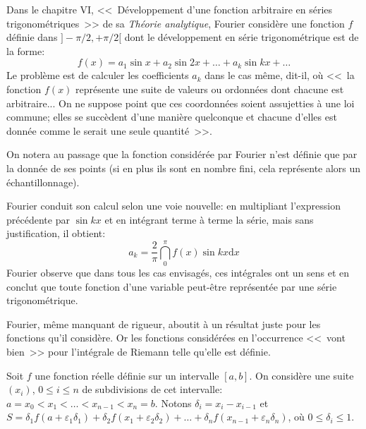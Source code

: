 \medskip
\begin{histoire}%
Dans le chapitre VI, <<~Développement d'une fonction arbitraire en séries
trigonométriques~>> de sa \emph{Théorie analytique}, Fourier
considère une fonction $f$
définie dans $]-\pi/2,+\pi/2[$ dont le développement en série trigonométrique est
de la forme:
\begin{equation} f(x)=a_1\sin x+a_2\sin 2x +\ldots+a_k\sin kx +\ldots\end{equation}
Le problème est de calculer les coefficients $a_k$ dans le cas même, dit-il, où <<~la
fonction $f(x)$ représente une suite de valeurs ou ordonnées dont chacune est
arbitraire... On ne suppose point que ces coordonnées soient assujetties à une
loi commune; elles se succèdent d'une manière quelconque et chacune d'elles
est donnée comme le serait une seule quantité~>>.

On notera au passage que la fonction considérée par Fourier
n'est définie que par la donnée de ses points (si en plus ils sont en nombre fini, cela représente alors
un échantillonnage).

\medskip
Fourier
conduit son calcul selon une voie nouvelle: en multipliant l'expression précédente
par $\sin kx$ et en intégrant terme à terme la série, mais sans justification, il obtient:
\begin{equation}a_k=\frac2{\pi}\dint_0^{\pi} f(x)\sin kx \mathrm dx\end{equation}
Fourier
observe que dans tous les cas envisagés, ces intégrales ont un sens et en conclut
que toute fonction d'une variable peut-être représentée par une série trigonométrique.

Fourier,
même manquant de rigueur, aboutit à un résultat juste pour les fonctions
qu'il considère.
Or les fonctions considérées en l'occurrence <<~vont bien~>> pour l'intégrale de Riemann
telle qu'elle est définie.

\medskip
\begin{definition}
Soit $f$ une fonction réelle définie sur un intervalle $[a,b]$.
On considère une suite $(x_i)$, $0\le i\le n$ de subdivisions de cet intervalle:
$a=x_0 < x_1 <\ldots < x_{n-1} <x_n=b$.
Notons $\delta_i=x_i-x_{i-1}$ et $S=\delta_1f(a+\varepsilon_1\delta_1) +
\delta_2 f(x_1+\varepsilon_2\delta_2)+ \ldots + \delta_nf(x_{n-1}+\varepsilon_n\delta_n)$,
où $0\le \delta_i\le 1$.


\end{definition}
\end{histoire}
